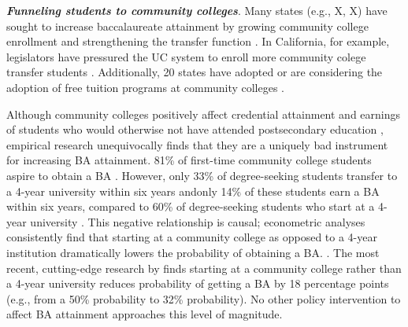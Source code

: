 \documentclass[twoside]{article}
\begin{document}
\textbf{\textit{Funneling students to community colleges}}. Many states (e.g., X, X) have sought to increase baccalaureate attainment by growing community college enrollment and strengthening the transfer function \citep{RN4430,RN4431}. In California, for example, legislators have pressured the UC system to enroll more community colege transfer students \citep{RN4427}. Additionally, 20 states have adopted or are considering the adoption of free tuition programs at community colleges \citep{RN4425,RN4426}.




Although community colleges positively affect credential attainment and earnings of students who would otherwise not have attended postsecondary education \citep[e.g., ][]{RN4404}, empirical research unequivocally finds that they are a uniquely bad instrument for increasing BA attainment. 81\% of first-time community college students aspire to obtain a BA \citep{RN4406}. However, only 33\% of degree-seeking students transfer to a 4-year university within six years \citep{RN4406} andonly 14\% of these students earn a BA within six years, compared to 60\% of degree-seeking students who start at a 4-year university \citep{RN4406}.  This negative relationship is causal; econometric analyses consistently find that starting at a community college as opposed to a 4-year institution dramatically lowers the probability of obtaining a BA. \citep[e.g., ][]{RN4284,RN2261,RN4292,RN4405}. The most recent, cutting-edge research by \cite{RN4404} finds starting at a community college rather than a 4-year university reduces probability of getting a BA by 18 percentage points (e.g., from a 50\% probability to 32\% probability).  No other policy intervention to affect BA attainment approaches this level of magnitude.
\end{document}
